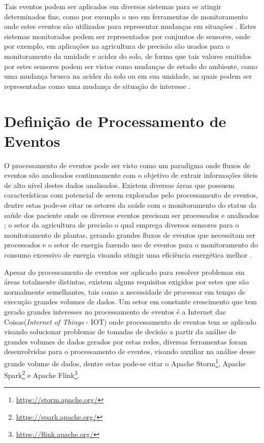 \documentclass[tid,table]{texufpel} %
\begin{document}
Tais eventos podem ser aplicados em diversos sistemas para se atingir determinados fins, como por exemplo o uso em ferramentas de monitoramento onde estes eventos são utilizados para representar mudanças em situações \cite{etzion2011event}. Estes sistemas monitorados podem ser representados por conjuntos de sensores, onde por exemplo, em aplicações na agricultura de precisão são usados para o monitoramento da umidade e acidez do solo, de forma que tais valores emitidos por estes sensores podem ser vistos como mudanças de estado do ambiente, como uma mudança brusca na acidez do solo ou em sua umidade, as quais podem ser representadas como uma mudança de situação de interesse \cite{garcia2011wireless}.

\section{Definição de Processamento de Eventos}
O processamento de eventos pode ser visto como um paradigma onde fluxos de eventos são analisados continuamente com o objetivo de extrair informações úteis de alto nível destes dados analisados. Existem diversas áreas que possuem características com potencial de serem exploradas pelo processamento de eventos, dentre estas pode-se citar os setores da saúde com o monitoramento do status da saúde dos paciente onde os diversos eventos precisam ser processados e analisados \cite{weiner2008health}; o setor da agricultura de precisão o qual emprega diversos sensores para o monitoramento de plantas, gerando grandes fluxos de eventos que necessitam ser processados \cite{garcia2011wireless} e o setor de energia fazendo uso de eventos para o monitoramento do consumo excessivo de energia visando atingir uma eficiência energética melhor \cite{vijayaraghavan2010automated}. 

Apesar do processamento de eventos ser aplicado para resolver problemas em áreas totalmente distintas, existem alguns requisitos exigidos por estes que são normalmente semelhantes, tais como a necessidade de processar em tempo de execução grandes volumes de dados. Um setor em constante  crescimento que tem gerado grandes interesses no processamento de eventos é a Internet das Coisas(\textit{Internet of Things} - IOT) onde processamento de eventos tem se aplicado visando solucionar problemas de tomadas de decisão a partir da análise de grandes volumes de dados gerados por estas redes, diversas ferramentas foram desenvolvidas para o processamento de eventos, visando auxiliar na análise desse grande volume de dados, dentre estas pode-se citar o Apache Storm\footnote{\url{https://storm.apache.org/}}, Apache Spark\footnote{\url{https://spark.apache.org/}} e Apache Flink\footnote{\url{https://flink.apache.org/}}.
\end{document}
